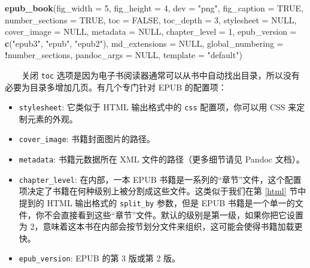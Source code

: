 \documentclass[
  12pt,
]{krantz}
\newenvironment{Shaded}{\begin{snugshade}}{\end{snugshade}}
\newcommand{\AttributeTok}[1]{\textcolor[rgb]{0.13,0.29,0.53}{#1}}
\newcommand{\ConstantTok}[1]{\textcolor[rgb]{0.56,0.35,0.01}{#1}}
\newcommand{\DecValTok}[1]{\textcolor[rgb]{0.00,0.00,0.81}{#1}}
\newcommand{\FunctionTok}[1]{\textcolor[rgb]{0.13,0.29,0.53}{\textbf{#1}}}
\newcommand{\NormalTok}[1]{#1}
\newcommand{\SpecialCharTok}[1]{\textcolor[rgb]{0.81,0.36,0.00}{\textbf{#1}}}
\newcommand{\StringTok}[1]{\textcolor[rgb]{0.31,0.60,0.02}{#1}}
\providecommand{\tightlist}{%
  \setlength{\itemsep}{0pt}\setlength{\parskip}{0pt}}
\theoremstyle{definition}
\theoremstyle{definition}
\theoremstyle{definition}
\theoremstyle{definition}
\theoremstyle{remark}
\begin{document}
\begin{Shaded}
\begin{Highlighting}[]
\FunctionTok{epub\_book}\NormalTok{(}\AttributeTok{fig\_width =} \DecValTok{5}\NormalTok{, }\AttributeTok{fig\_height =} \DecValTok{4}\NormalTok{, }\AttributeTok{dev =} \StringTok{"png"}\NormalTok{,}
  \AttributeTok{fig\_caption =} \ConstantTok{TRUE}\NormalTok{, }\AttributeTok{number\_sections =} \ConstantTok{TRUE}\NormalTok{,}
  \AttributeTok{toc =} \ConstantTok{FALSE}\NormalTok{, }\AttributeTok{toc\_depth =} \DecValTok{3}\NormalTok{, }\AttributeTok{stylesheet =} \ConstantTok{NULL}\NormalTok{,}
  \AttributeTok{cover\_image =} \ConstantTok{NULL}\NormalTok{, }\AttributeTok{metadata =} \ConstantTok{NULL}\NormalTok{,}
  \AttributeTok{chapter\_level =} \DecValTok{1}\NormalTok{,}
  \AttributeTok{epub\_version =} \FunctionTok{c}\NormalTok{(}\StringTok{"epub3"}\NormalTok{, }\StringTok{"epub"}\NormalTok{, }\StringTok{"epub2"}\NormalTok{),}
  \AttributeTok{md\_extensions =} \ConstantTok{NULL}\NormalTok{,}
  \AttributeTok{global\_numbering =} \SpecialCharTok{!}\NormalTok{number\_sections,}
  \AttributeTok{pandoc\_args =} \ConstantTok{NULL}\NormalTok{, }\AttributeTok{template =} \StringTok{"default"}\NormalTok{)}
\end{Highlighting}
\end{Shaded}

  关闭 \texttt{toc} 选项是因为电子书阅读器通常可以从书中自动找出目录，所以没有必要为目录多增加几页。有几个专门针对 EPUB 的配置项：

\begin{itemize}
\tightlist
\item
  \texttt{stylesheet}: 它类似于 HTML 输出格式中的 \texttt{css} 配置项，你可以用 CSS 来定制元素的外观。
\item
  \texttt{cover\_image}: 书籍封面图片的路径。
\item
  \texttt{metadata}: 书籍元数据所在 XML 文件的路径（更多细节请见 Pandoc 文档）。
\item
  \texttt{chapter\_level}: 在内部，一本 EPUB 书籍是一系列的``章节''文件，这个配置项决定了书籍在何种级别上被分割成这些文件。这类似于我们在第 \ref{html} 节中提到的 HTML 输出格式的 \texttt{split\_by} 参数，但是 EPUB 书籍是一个单一的文件，你不会直接看到这些``章节''文件。默认的级别是第一级，如果你把它设置为 2，意味着这本书在内部会按节划分文件来组织，这可能会使得书籍加载更快。
\item
  \texttt{epub\_version}: EPUB 的第 3 版或第 2 版。
\end{itemize}
\end{document}
